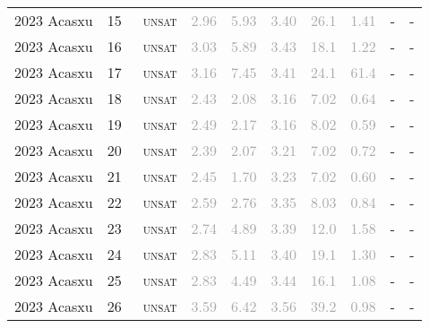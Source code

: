 \begin{center}
{\begin{longtable}{@{}llllllllll@{}}
2023 Acasxu & 15 & ~\textsc{unsat} & \textcolor{darkgray}{2.96} & \textcolor{darkgray}{5.93} & \textcolor{darkgray}{3.40} & \textcolor{darkgray}{26.1} & \textcolor{darkgray}{1.41} & - & - \\
2023 Acasxu & 16 & ~\textsc{unsat} & \textcolor{darkgray}{3.03} & \textcolor{darkgray}{5.89} & \textcolor{darkgray}{3.43} & \textcolor{darkgray}{18.1} & \textcolor{darkgray}{1.22} & - & - \\
2023 Acasxu & 17 & ~\textsc{unsat} & \textcolor{darkgray}{3.16} & \textcolor{darkgray}{7.45} & \textcolor{darkgray}{3.41} & \textcolor{darkgray}{24.1} & \textcolor{darkgray}{61.4} & - & - \\
2023 Acasxu & 18 & ~\textsc{unsat} & \textcolor{darkgray}{2.43} & \textcolor{darkgray}{2.08} & \textcolor{darkgray}{3.16} & \textcolor{darkgray}{7.02} & \textcolor{darkgray}{0.64} & - & - \\
2023 Acasxu & 19 & ~\textsc{unsat} & \textcolor{darkgray}{2.49} & \textcolor{darkgray}{2.17} & \textcolor{darkgray}{3.16} & \textcolor{darkgray}{8.02} & \textcolor{darkgray}{0.59} & - & - \\
2023 Acasxu & 20 & ~\textsc{unsat} & \textcolor{darkgray}{2.39} & \textcolor{darkgray}{2.07} & \textcolor{darkgray}{3.21} & \textcolor{darkgray}{7.02} & \textcolor{darkgray}{0.72} & - & - \\
2023 Acasxu & 21 & ~\textsc{unsat} & \textcolor{darkgray}{2.45} & \textcolor{darkgray}{1.70} & \textcolor{darkgray}{3.23} & \textcolor{darkgray}{7.02} & \textcolor{darkgray}{0.60} & - & - \\
2023 Acasxu & 22 & ~\textsc{unsat} & \textcolor{darkgray}{2.59} & \textcolor{darkgray}{2.76} & \textcolor{darkgray}{3.35} & \textcolor{darkgray}{8.03} & \textcolor{darkgray}{0.84} & - & - \\
2023 Acasxu & 23 & ~\textsc{unsat} & \textcolor{darkgray}{2.74} & \textcolor{darkgray}{4.89} & \textcolor{darkgray}{3.39} & \textcolor{darkgray}{12.0} & \textcolor{darkgray}{1.58} & - & - \\
2023 Acasxu & 24 & ~\textsc{unsat} & \textcolor{darkgray}{2.83} & \textcolor{darkgray}{5.11} & \textcolor{darkgray}{3.40} & \textcolor{darkgray}{19.1} & \textcolor{darkgray}{1.30} & - & - \\
2023 Acasxu & 25 & ~\textsc{unsat} & \textcolor{darkgray}{2.83} & \textcolor{darkgray}{4.49} & \textcolor{darkgray}{3.44} & \textcolor{darkgray}{16.1} & \textcolor{darkgray}{1.08} & - & - \\
2023 Acasxu & 26 & ~\textsc{unsat} & \textcolor{darkgray}{3.59} & \textcolor{darkgray}{6.42} & \textcolor{darkgray}{3.56} & \textcolor{darkgray}{39.2} & \textcolor{darkgray}{0.98} & - & - \\

\end{longtable}}
\end{center}
